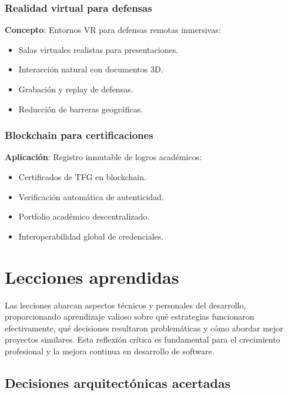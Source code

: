 \documentclass[12pt,a4paper,oneside]{report}
\providecommand{\tightlist}{%
  \setlength{\itemsep}{0pt}\setlength{\parskip}{0pt}}
\begin{document}
\subsubsection{Realidad virtual para
defensas}\label{realidad-virtual-para-defensas}

\textbf{Concepto}: Entornos VR para defensas remotas inmersivas:

\begin{itemize}
\tightlist
\item
  Salas virtuales realistas para presentaciones.
\item
  Interacción natural con documentos 3D.
\item
  Grabación y replay de defensas.
\item
  Reducción de barreras geográficas.
\end{itemize}

\subsubsection{Blockchain para
certificaciones}\label{blockchain-para-certificaciones}

\textbf{Aplicación}: Registro inmutable de logros académicos:

\begin{itemize}
\tightlist
\item
  Certificados de TFG en blockchain.
\item
  Verificación automática de autenticidad.
\item
  Portfolio académico descentralizado.
\item
  Interoperabilidad global de credenciales.
\end{itemize}

\section{Lecciones aprendidas}\label{lecciones-aprendidas}

Las lecciones abarcan aspectos técnicos y personales del desarrollo, proporcionando aprendizaje valioso sobre qué estrategias funcionaron efectivamente, qué decisiones resultaron problemáticas y cómo abordar mejor proyectos similares. Esta reflexión crítica es fundamental para el crecimiento profesional y la mejora continua en desarrollo de software.

\subsection{Decisiones arquitectónicas
acertadas}\label{decisiones-arquitectuxf3nicas-acertadas}
\end{document}

